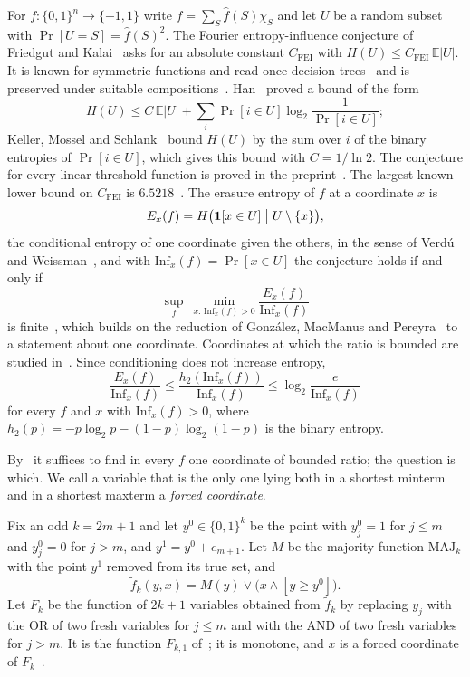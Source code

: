\documentclass[11pt]{amsart}
\theoremstyle{remark}
\newcommand{\Inf}{\mathrm{Inf}}
\newcommand{\E}{\mathbb{E}}
\newcommand{\MAJ}{\mathrm{MAJ}}
\begin{document}
For $f\colon\{0,1\}^n\to\{-1,1\}$ write $f=\sum_S\hat f(S)\chi_S$ and let $U$ be a random subset with
$\Pr[U=S]=\hat f(S)^2$. The Fourier entropy-influence conjecture of Friedgut and Kalai~\cite{FK96} asks for an absolute
constant $C_{\mathrm{FEI}}$ with $H(U)\le C_{\mathrm{FEI}}\,\E|U|$. It is known for symmetric functions and read-once
decision trees~\cite{OWZ} and is preserved under suitable compositions~\cite{OT13}. Han~\cite{Han} proved a bound of the
form
\[
H(U)\le C\,\E|U|+\sum_i\Pr[i\in U]\log_2\frac1{\Pr[i\in U]};
\]
Keller, Mossel and Schlank~\cite[Claim~4.1]{KMS12} bound $H(U)$ by the sum over $i$ of the binary entropies of
$\Pr[i\in U]$, which gives this bound with $C=1/\ln 2$. The conjecture for every linear threshold function is proved in
the preprint~\cite{ShmLTF}. The largest known lower bound on $C_{\mathrm{FEI}}$ is $6.5218$~\cite{Num26}. The erasure entropy of $f$ at a coordinate $x$ is
\[
E_x(f)=H\bigl(\mathbf 1[x\in U]\bigm|U\setminus\{x\}\bigr),
\]
the conditional entropy of one coordinate given the others, in the sense of Verd\'u and Weissman~\cite{VW08}, and
with $\Inf_x(f)=\Pr[x\in U]$ the conjecture holds if and only if
\[
\sup_f\ \min_{x:\,\Inf_x(f)>0}\frac{E_x(f)}{\Inf_x(f)}
\]
is finite~\cite{Shm1}, which builds on the reduction of Gonz\'alez, MacManus and Pereyra~\cite{GMP} to a
statement about one coordinate. Coordinates at which the ratio is bounded are studied in~\cite{Shm3}. Since conditioning does not increase entropy,
\begin{equation}\label{eq:upper}
\frac{E_x(f)}{\Inf_x(f)}\le\frac{h_2(\Inf_x(f))}{\Inf_x(f)}\le\log_2\frac{e}{\Inf_x(f)}
\end{equation}
for every $f$ and $x$ with $\Inf_x(f)>0$, where $h_2(p)=-p\log_2p-(1-p)\log_2(1-p)$ is the binary entropy.

By~\cite{Shm1} it suffices to find in every $f$ one coordinate of bounded ratio; the question is which. We call a
variable that is the only one lying both in a shortest minterm and in a shortest maxterm a \emph{forced coordinate}.

Fix an odd $k=2m+1$ and let $y^0\in\{0,1\}^k$ be the point with $y^0_j=1$ for $j\le m$ and $y^0_j=0$ for $j>m$,
and $y^1=y^0+e_{m+1}$. Let $M$ be the majority function $\MAJ_k$ with the point $y^1$ removed from its true set, and
\[
\tilde f_k(y,x)=M(y)\vee\bigl(x\wedge[y\ge y^0]\bigr).
\]
Let $F_k$ be the function of $2k+1$ variables obtained from $\tilde f_k$ by replacing $y_j$ with the OR of two fresh
variables for $j\le m$ and with the AND of two fresh variables for $j>m$. It is the function $F_{k,1}$
of~\cite[Section~5]{Shm8}; it is monotone, and $x$ is a forced coordinate of $F_k$~\cite[Section~5]{Shm8}.
\end{document}
